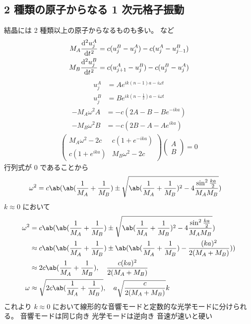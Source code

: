 \documentclass[uplatex,dvipdfmx,a4paper,11pt]{jlreq}
\numberwithin{equation}{section}
\theoremstyle{definition}
\begin{document}
\subsection{2 種類の原子からなる 1 次元格子振動}
結晶には 2 種類以上の原子からなるものも多い。
 など
\begin{align}
  M_A\diff[2]{u_j^A}{t} & = c(u_j^B - u_j^A) - c(u_j^A - u_{j-1}^B) \\
  M_B\diff[2]{u_j^B}{t} & = c(u_{j+1}^A - u_j^B) - c(u_j^B - u_j^A)
\end{align}
\begin{align}
  u_j^A & = Ae^{ik(n-1)a - i\omega t}           \\
  u_j^B & = Be^{ik(n-\frac{1}{2})a - i\omega t}
\end{align}
\begin{align}
  -M_A\omega^2A & = -c(2A - B - Be^{-ika}) \\
  -M_B\omega^2B & = -c(2B - A - Ae^{ika})
\end{align}
\begin{align}
  \begin{pmatrix}
    M_A\omega^2 - 2c & c(1 + e^{-ika})  \\
    c(1 + e^{ika})   & M_B\omega^2 - 2c
  \end{pmatrix}
  \begin{pmatrix}
    A \\ B
  \end{pmatrix}
  = 0
\end{align}
行列式が $0$ であることから
\begin{align}
  \omega^2 & = c\ab(\ab(\frac{1}{M_A} + \frac{1}{M_B})\pm\sqrt{\ab(\frac{1}{M_A} + \frac{1}{M_B})^2 - 4\frac{\sin^2\frac{ka}{2}}{M_AM_B}})
\end{align}
$k \approx 0$ において
\begin{align}
  \omega^2 & = c\ab(\ab(\frac{1}{M_A} + \frac{1}{M_B})\pm\sqrt{\ab(\frac{1}{M_A} + \frac{1}{M_B})^2 - 4\frac{\sin^2\frac{ka}{2}}{M_AM_B}}) \\
           & \approx c\ab(\ab(\frac{1}{M_A} + \frac{1}{M_B})\pm\ab(\ab(\frac{1}{M_A} + \frac{1}{M_B}) - \frac{(ka)^2}{2(M_A + M_B)}))      \\
           & \approx 2c\ab(\frac{1}{M_A} + \frac{1}{M_B}), \quad \frac{c(ka)^2}{2(M_A + M_B)}                                              \\
  \omega   & \approx \sqrt{2c\ab(\frac{1}{M_A} + \frac{1}{M_B})}, \quad a\sqrt{\frac{c}{2(M_A + M_B)}}k
\end{align}
これより $k \approx 0$ において線形的な音響モードと定数的な光学モードに分けられる。
音響モードは同じ向き
光学モードは逆向き
音速が速いと硬い
\end{document}
